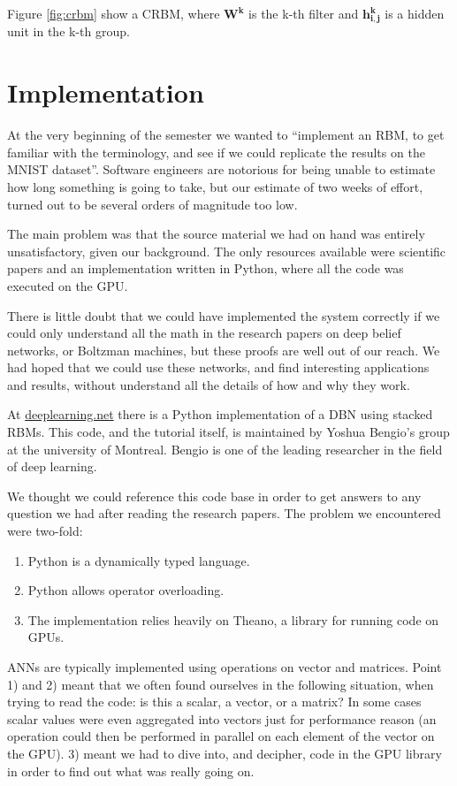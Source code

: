 \documentclass[11pt]{article}
\begin{document}
\newpage

Figure \ref{fig:crbm} show a CRBM, where $\mathbf{W^k}$ is the k-th filter and $\mathbf{h^k_{i,j}}$ is a hidden unit in the k-th group.

\section{Implementation}

At the very beginning of the semester we wanted to ``implement an RBM, to get familiar with the terminology, and see if we could replicate the results on the MNIST dataset''.  Software engineers are notorious for being unable to estimate how long something is going to take, but our estimate of two weeks of effort, turned out to be several orders of magnitude too low.

The main problem was that the source material we had on hand was entirely unsatisfactory, given our background.  The only resources available were scientific papers and an implementation written in Python, where all the code was executed on the GPU.

There is little doubt that we could have implemented the system correctly if we could only understand all the math in the research papers on deep belief networks, or Boltzman machines, but these proofs are well out of our reach.  We had hoped that we could use these networks, and find interesting applications and results, without understand all the details of how and why they work.

At \href{http://deeplearning.net/tutorial}{deeplearning.net} there is a Python implementation of a DBN using stacked RBMs.  This code, and the tutorial itself, is maintained by Yoshua Bengio's group at the university of Montreal.  Bengio is one of the leading researcher in the field of deep learning.

We thought we could reference this code base in order to get answers to any question we had after reading the research papers.  The problem we encountered were two-fold:

\begin{enumerate}
 \item Python is a dynamically typed language.
 \item Python allows operator overloading.
 \item The implementation relies heavily on Theano, a library for running code on GPUs.
\end{enumerate}

ANNs are typically implemented using operations on vector and matrices.  Point 1) and 2) meant that we often found ourselves in the following situation, when trying to read the code: is this a scalar, a vector, or a matrix?  In some cases scalar values were even aggregated into vectors just for performance reason (an operation could then be performed in parallel on each element of the vector on the GPU).  3) meant we had to dive into, and decipher, code in the GPU library in order to find out what was really going on.
\end{document}

